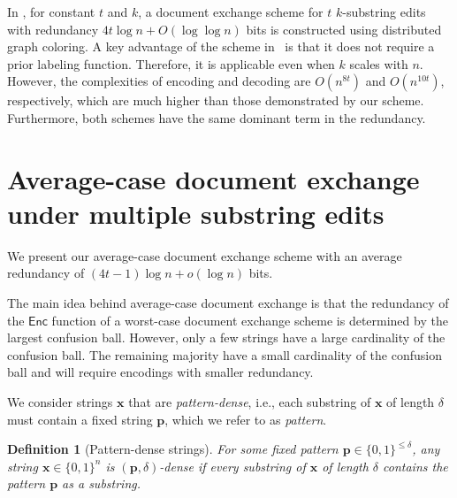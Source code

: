 \documentclass[onecolumn]{IEEEtran}
\newtheorem{definition}{Definition}
\newcommand{\bl}{n}
\newcommand{\numedits}{t}
\newcommand{\editsize}{k}
\newcommand{\encode}{\mathsf{Enc}}
\newcommand{\bfp}{{\mathbf{ p}}}
\newcommand{\bfx}{{\mathbf{ x}}}
\begin{document}
In \cite{Li_Distributed_graph_coloring}, for constant  $\numedits$ and $\editsize$, a document exchange scheme for $\numedits$ $\editsize$-substring edits with redundancy $4\numedits\log\bl + O(\log\log\bl)$ bits is constructed using distributed graph coloring. A key advantage of the scheme in~\cite{Li_Distributed_graph_coloring} is that it does not require a prior labeling function. Therefore, it is applicable even when $\editsize$ scales with $\bl$. However, the complexities of encoding and decoding are $O(\bl^{8\numedits})$ and $O(\bl^{10\numedits})$, respectively, which are much higher than those demonstrated by our scheme. Furthermore, both schemes have the same dominant term in the redundancy.

\section{Average-case document exchange under multiple substring edits }
\label{sec:Avg_Dx}
We present our average-case document exchange scheme with an average redundancy of $(4\numedits-1)\log\bl + o(\log\bl)$ bits. %

The main idea behind average-case document exchange is that the redundancy of the $\encode$ function of a worst-case document exchange scheme is determined by the largest confusion ball. However, only a few strings have a large cardinality of the confusion ball. The remaining majority have a small cardinality of the confusion ball and will require encodings with smaller redundancy. 

We consider strings $\bfx$ that are \emph{pattern-dense}, i.e.,  each substring of $\bfx$ of length $\delta$ must contain a fixed string $\bfp$, which we refer to as \emph{pattern}. 
\begin{definition}[Pattern-dense strings]
        For some fixed pattern $\mathbf{p}\in\{0,1\}^{\leq \delta}$, any string $\mathbf{x} \in \{0,1\}^\bl$ is \emph{$(\mathbf{p}, \delta)$-dense} if every substring of $\mathbf{x}$ of length $\delta$ contains the pattern $\bfp$ as a substring.
\end{definition}
\end{document}
